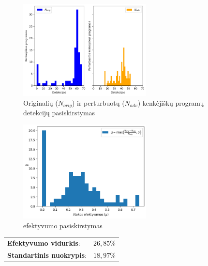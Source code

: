 \begin{figure}[h]
    \begin{small}
        \begin{center}
            \includegraphics[width=0.6\textwidth]{img/det_distributions.png}
        \end{center}
        \caption{Originalių ($N_{orig}$) ir perturbuotų ($N_{adv}$) kenkėjiškų programų detekcijų pasiskirstymas}\label{fig:experiment:det_dist}
    \end{small}
\end{figure}

\begin{figure}[h]
    \begin{small}
        \begin{center}
            \includegraphics[width=0.6\textwidth]{img/mu_distribution.png}
        \end{center}
        \caption{ efektyvumo pasiskirstymas}\label{fig:experiment:mu_dist}
    \end{small}
\end{figure}

\begin{tabular}{ll}
    \textbf{Efektyvumo vidurkis}:    & $26,85\%$ \\
    \textbf{Standartinis nuokrypis}: & $18,97\%$
\end{tabular}